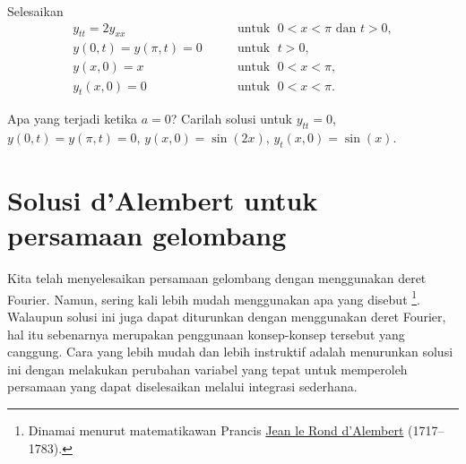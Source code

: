 \begin{exercise}
Selesaikan
\begin{equation*}
\begin{array}{ll}
y_{tt} = 2 y_{xx} & \qquad \text{untuk } \; 0 < x < \pi \text{ dan } t > 0,  \\
y(0,t) = y(\pi,t) = 0 & \qquad \text{untuk } \; t > 0 , \\
y(x,0) = x & \qquad \text{untuk } \; 0 < x < \pi , \\
y_t(x,0) = 0 & \qquad \text{untuk } \; 0 < x < \pi .
\end{array}
\end{equation*}
\end{exercise}
\exsol{%
$
y(x,t)
=
\sum\limits_{n=1}^\infty
\frac{2{(-1)}^{n+1}}{n}
\sin(nx)
\cos( n \sqrt{2}\,t ) 
$
}

\begin{exercise}
Apa yang terjadi ketika $a=0$?  Carilah solusi untuk
$y_{tt} = 0$, $y(0,t) = y(\pi,t) = 0$,
$y(x,0) = \sin(2x)$,
$y_t(x,0) = \sin(x)$.
\end{exercise}


\sectionnewpage
\section{Solusi d'Alembert untuk persamaan gelombang}
\label{dalemb:section}



Kita telah menyelesaikan persamaan gelombang dengan menggunakan deret Fourier.  Namun, sering kali
lebih mudah menggunakan apa yang disebut
\emph{}%
\footnote{Dinamai menurut matematikawan Prancis
\href{https://en.wikipedia.org/wiki/D\%27Alembert}{Jean le Rond d'Alembert}
(1717--1783).}.
Walaupun solusi ini juga dapat diturunkan dengan menggunakan deret Fourier,
hal itu sebenarnya merupakan penggunaan konsep-konsep tersebut yang canggung.  Cara yang lebih mudah dan lebih
instruktif adalah menurunkan
solusi ini dengan melakukan perubahan variabel yang tepat untuk memperoleh persamaan yang
dapat diselesaikan melalui integrasi sederhana.

